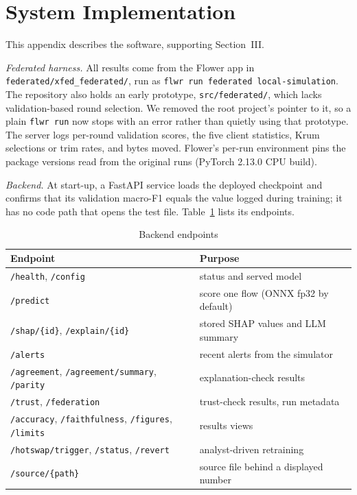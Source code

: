 \section{System Implementation}
\label{app:system}
This appendix describes the software, supporting Section~III.

\emph{Federated harness.} All results come from the Flower app in
\texttt{federated/xfed\_federated/}, run as \texttt{flwr run federated local-simulation}.
The repository also holds an early prototype, \texttt{src/federated/}, which lacks
validation-based round selection. We removed the root project's pointer to it, so a plain
\texttt{flwr run} now stops with an error rather than quietly using that prototype. The server logs per-round
validation scores, the five client statistics, Krum selections or trim rates, and bytes
moved. Flower's per-run environment pins the package versions read from the original
runs (PyTorch 2.13.0 CPU build).

\emph{Backend.} At start-up, a FastAPI service loads the deployed checkpoint and
confirms that its validation macro-F1 equals the value logged during training; it has no
code path that opens the test file. Table~\ref{tab:api}
lists its endpoints.

\begin{table}[h]
\centering
\caption{Backend endpoints}
\label{tab:api}
\footnotesize
\begin{tabularx}{\columnwidth}{@{}lX@{}}
\toprule
Endpoint & Purpose\\
\midrule
\texttt{/health}, \texttt{/config} & status and served model\\
\texttt{/predict} & score one flow (ONNX fp32 by default)\\
\texttt{/shap/\{id\}}, \texttt{/explain/\{id\}} & stored SHAP values and LLM summary\\
\texttt{/alerts} & recent alerts from the simulator\\
\texttt{/agreement}, \texttt{/agreement/summary}, \texttt{/parity} & explanation-check results\\
\texttt{/trust}, \texttt{/federation} & trust-check results, run metadata\\
\texttt{/accuracy}, \texttt{/faithfulness}, \texttt{/figures}, \texttt{/limits} & results views\\
\texttt{/hotswap/trigger}, \texttt{/status}, \texttt{/revert} & analyst-driven retraining\\
\texttt{/source/\{path\}} & source file behind a displayed number\\
\bottomrule
\end{tabularx}
\end{table}

